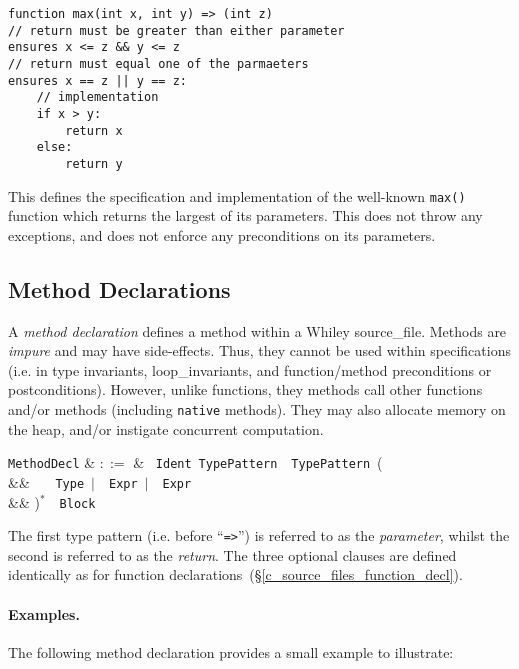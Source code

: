 \begin{lstlisting}
function max(int x, int y) => (int z)
// return must be greater than either parameter
ensures x <= z && y <= z
// return must equal one of the parmaeters
ensures x == z || y == z:
    // implementation
    if x > y:
        return x
    else:
        return y
\end{lstlisting}

This defines the specification and implementation of the well-known
\lstinline{max()} function which returns the largest of its
parameters. This does not throw any exceptions, and does not enforce
any preconditions on its parameters.


\subsection{Method Declarations}
\label{c_source_files_method_decl}

A {\em method declaration} defines a method within a Whiley
\gls{source_file}.  Methods are {\em impure} and may have
side-effects.  Thus, they cannot be used within specifications
(i.e. in type invariants, \gls{loop_invariant}s, and function/method
\gls{precondition}s or \gls{postcondition}s).  However, unlike
functions, they methods call other functions and/or methods (including
\lstinline{native} methods).  They may also allocate memory on the
heap, and/or instigate concurrent computation.

\begin{syntax}
  \verb+MethodDecl+ & $::=$ & \ \verb+Ident+\
  \verb+TypePattern+\ \token{=>}\ \verb+TypePattern+\ \big(\\
  && \ \ \ \verb+Type+\ $|$\ \
  \verb+Expr+\ $|$\ \ \verb+Expr+\\
  && \big)$^*$\ \token{:}\ \verb+Block+\\
\end{syntax}

The first type pattern (i.e. before ``\lstinline{=>}'') is referred to as the {\em parameter}, whilst the second is referred to as the {\em   return}.  The three optional clauses are defined identically as for function declarations~(\S\ref{c_source_files_function_decl}).

\paragraph{Examples.}  The following method declaration provides a
small example to illustrate:

